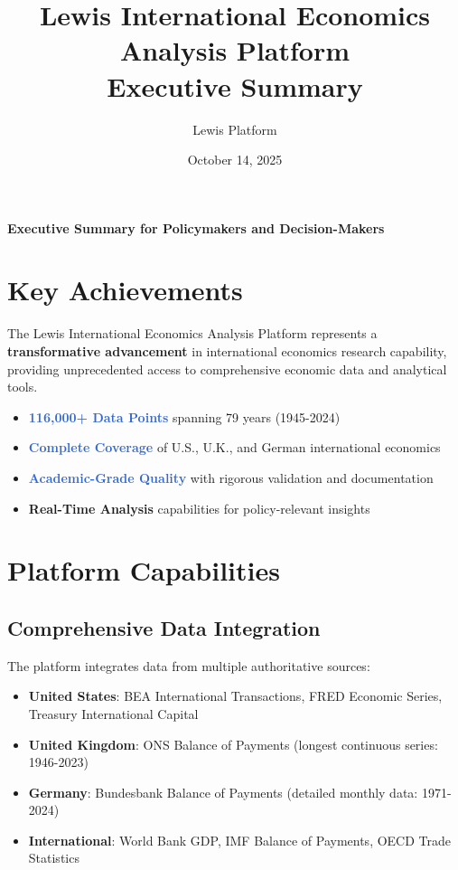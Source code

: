 \documentclass[11pt,a4paper]{article}
\title{\textbf{Lewis International Economics Analysis Platform} \\
\large Executive Summary}
\author{Lewis Platform}
\date{October 14, 2025}
\begin{document}
\maketitle

\begin{center}
\textbf{\large Executive Summary for Policymakers and Decision-Makers}
\end{center}

\vspace{0.5cm}

\section{Key Achievements}

The Lewis International Economics Analysis Platform represents a \textbf{transformative advancement} in international economics research capability, providing unprecedented access to comprehensive economic data and analytical tools.

\begin{itemize}
    \item \textcolor{highlight}{\textbf{116,000+ Data Points}} spanning 79 years (1945-2024)
    \item \textcolor{highlight}{\textbf{Complete Coverage}} of U.S., U.K., and German international economics
    \item \textcolor{highlight}{\textbf{Academic-Grade Quality}} with rigorous validation and documentation
    \item \textbf{Real-Time Analysis} capabilities for policy-relevant insights
\end{itemize}

\section{Platform Capabilities}

\subsection{Comprehensive Data Integration}
The platform integrates data from multiple authoritative sources:

\begin{itemize}
    \item \textbf{United States}: BEA International Transactions, FRED Economic Series, Treasury International Capital
    \item \textbf{United Kingdom}: ONS Balance of Payments (longest continuous series: 1946-2023)
    \item \textbf{Germany}: Bundesbank Balance of Payments (detailed monthly data: 1971-2024)
    \item \textbf{International}: World Bank GDP, IMF Balance of Payments, OECD Trade Statistics
\end{itemize}
\end{document}
